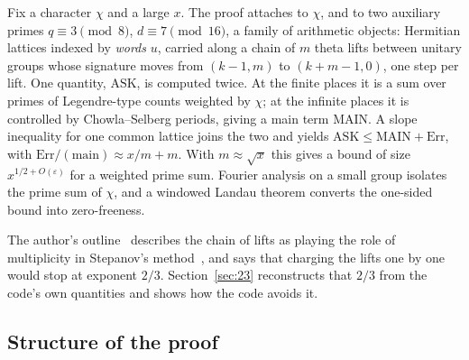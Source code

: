 \documentclass[11pt]{article}
\newcommand{\eps}{\varepsilon}
\newcommand{\ASK}{\mathrm{ASK}}
\newcommand{\MAIN}{\mathrm{MAIN}}
\newcommand{\Err}{\mathrm{Err}}
\theoremstyle{plain}
\theoremstyle{definition}
\begin{document}
Fix a character $\chi$ and a large $x$. The proof attaches to $\chi$, and to two auxiliary primes
$q\equiv 3 \pmod 8$, $d\equiv 7\pmod{16}$, a family of arithmetic objects: Hermitian lattices
indexed by \emph{words} $u$, carried along a chain of $m$ theta lifts between unitary groups whose
signature moves from $(k-1,m)$ to $(k+m-1,0)$, one step per lift. One quantity, $\ASK$, is computed
twice. At the finite places it is a sum over primes of Legendre-type counts weighted by $\chi$; at
the infinite places it is controlled by Chowla--Selberg periods, giving a main term $\MAIN$. A slope
inequality for one common lattice joins the two and yields $\ASK\le \MAIN + \Err$, with
$\Err/(\text{main}) \approx x/m + m$. With $m\approx\sqrt{x}$ this gives a bound of size
$x^{1/2+O(\eps)}$ for a weighted prime sum. Fourier analysis on a small group isolates the prime sum
of $\chi$, and a windowed Landau theorem converts the one-sided bound into zero-freeness.

The author's outline~\cite{alpoge-remark} describes the chain of lifts as playing the role of
multiplicity in Stepanov's method~\cite{iwaniec-kowalski}, and says that charging the lifts one by one would stop at exponent $2/3$. Section~\ref{sec:23}
reconstructs that $2/3$ from the code's own quantities and shows how the code avoids it.

\subsection{Structure of the proof}
\end{document}
